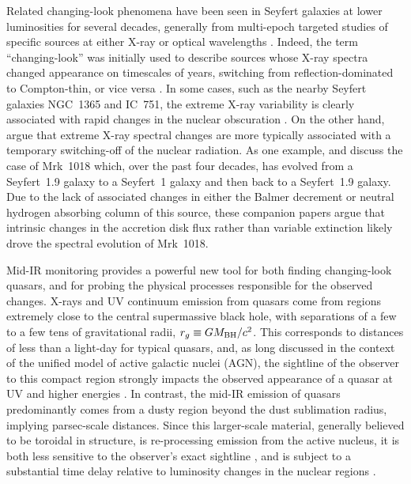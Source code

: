 \documentclass[iop]{emulateapj}
\def\eg{{e.g.}}
\begin{document}
Related changing-look phenomena have been seen in Seyfert galaxies
at lower luminosities for several decades, generally from multi-epoch
targeted studies of specific sources at either X-ray or optical
wavelengths \citep[\eg,][and references therein]{Tohline:76,
Goodrich:89, StorchiBergmann:95b, Shappee:14}.  Indeed, the term
``changing-look'' was initially used to describe sources whose X-ray
spectra changed appearance on timescales of years, switching from
reflection-dominated to Compton-thin, or vice versa
\citep[\eg,][]{Matt:03}.  In some cases, such as the nearby Seyfert
galaxies NGC~1365 and IC~751, the extreme X-ray variability is
clearly associated with rapid changes in the nuclear obscuration
\citep[\eg,][]{Risaliti:02, Walton:14, Rivers:15, Ricci:16}.  On
the other hand, \citet{Matt:03} argue that extreme X-ray spectral
changes are more typically associated with a temporary switching-off
of the nuclear radiation. As one example, \citet{McElroy:16} and
\citet{Husemann:16} discuss the case of Mrk~1018 which, over the
past four decades, has evolved from a Seyfert~1.9 galaxy to a
Seyfert~1 galaxy and then back to a Seyfert~1.9 galaxy.  Due to the
lack of associated changes in either the Balmer decrement or neutral
hydrogen absorbing column of this source, these companion papers
argue that intrinsic changes in the accretion disk flux rather than
variable extinction likely drove the spectral evolution of Mrk~1018.

Mid-IR monitoring provides a powerful new tool for both finding
changing-look quasars, and for probing the physical processes
responsible for the observed changes.  X-rays and UV continuum
emission from quasars come from regions extremely close to the
central supermassive black hole, with separations of a few to a few
tens of gravitational radii, $r_g \equiv G M_{\rm BH} / c^2$.  This corresponds
to distances of less than a light-day for typical quasars, and, as
long discussed in the context of the unified model of active
galactic nuclei (AGN), the sightline of the observer to this compact
region strongly impacts the observed appearance of a quasar at UV
and higher energies \citep[\eg,][]{Urry:95}.  In contrast, the mid-IR
emission of quasars predominantly comes from a dusty region beyond
the dust sublimation radius, implying parsec-scale distances.  Since
this larger-scale material, generally believed to be toroidal in
structure, is re-processing emission from the active nucleus, it
is both less sensitive to the observer's exact sightline
\citep[\eg,][]{Stern:05, Stern:12, Assef:13}, and is subject to a
substantial time delay relative to luminosity changes in the nuclear
regions \citep[\eg,][]{Jun:15b, Ichikawa:17}.
\end{document}
